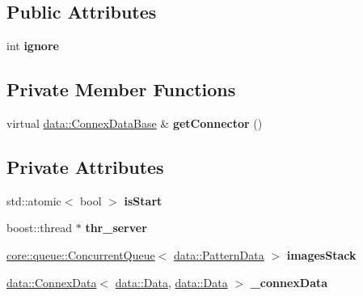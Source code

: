 \subsection*{Public Attributes}
\begin{DoxyCompactItemize}
\item 
\mbox{\label{classfilter_1_1algos_1_1_kill_a04c313841b5c863edd542a6739509271}} 
int {\bfseries ignore}
\end{DoxyCompactItemize}
\subsection*{Private Member Functions}
\begin{DoxyCompactItemize}
\item 
\mbox{\label{classfilter_1_1algos_1_1_kill_a916347ca6b529b803b7fea3255329dea}} 
virtual \hyperlink{classfilter_1_1data_1_1_connex_data_base}{data\+::\+Connex\+Data\+Base} \& {\bfseries get\+Connector} ()
\end{DoxyCompactItemize}
\subsection*{Private Attributes}
\begin{DoxyCompactItemize}
\item 
\mbox{\label{classfilter_1_1algos_1_1_kill_a2477ea4aae77c48fc411b42ef40618aa}} 
std\+::atomic$<$ bool $>$ {\bfseries is\+Start}
\item 
\mbox{\label{classfilter_1_1algos_1_1_kill_a2b05b2acb2d537459157bdb934050f89}} 
boost\+::thread $\ast$ {\bfseries thr\+\_\+server}
\item 
\mbox{\label{classfilter_1_1algos_1_1_kill_a26626447220976cc439b126d4e6ab895}} 
\hyperlink{classcore_1_1queue_1_1_concurrent_queue}{core\+::queue\+::\+Concurrent\+Queue}$<$ \hyperlink{classfilter_1_1data_1_1_pattern_data}{data\+::\+Pattern\+Data} $>$ {\bfseries images\+Stack}
\item 
\mbox{\label{classfilter_1_1algos_1_1_kill_a0989b5c1f642520167a29cebb7db57dd}} 
\hyperlink{classfilter_1_1data_1_1_connex_data}{data\+::\+Connex\+Data}$<$ \hyperlink{classfilter_1_1data_1_1_data}{data\+::\+Data}, \hyperlink{classfilter_1_1data_1_1_data}{data\+::\+Data} $>$ {\bfseries \+\_\+connex\+Data}
\end{DoxyCompactItemize}
